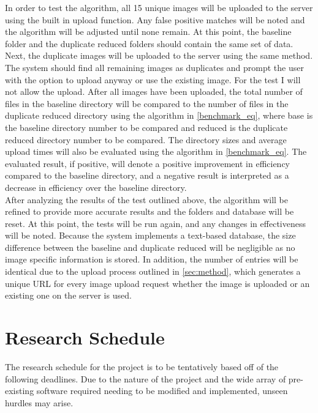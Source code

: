 \documentclass[11pt]{article}
\begin{document}
In order to test the algorithm, all 15 unique images will be uploaded to the server using the built in upload function. Any false positive matches will be noted and the algorithm will be adjusted until none remain. At this point, the baseline folder and the duplicate reduced folders should contain the same set of data. Next, the duplicate images will be uploaded to the server using the same method. The system should find all remaining images as duplicates and prompt the user with the option to upload anyway or use the existing image. For the test I will not allow the upload. After all images have been uploaded, the total number of files in the baseline directory will be compared to the number of files in the duplicate reduced directory using the algorithm in \ref{benchmark_eq}, where base is the baseline directory number to be compared and reduced is the duplicate reduced directory number to be compared.  The directory sizes and average upload times will also be evaluated using the algorithm in \ref{benchmark_eq}. The evaluated result, if positive, will denote a positive improvement in efficiency compared to the baseline directory, and a negative result is interpreted as a decrease in efficiency over the baseline directory.\\

After analyzing the results of the test outlined above, the algorithm will be refined to provide more accurate results and the folders and database will be reset. At this point, the tests will be run again, and any changes in effectiveness will be noted. Because the system implements a text-based database, the size difference between the baseline and duplicate reduced will be negligible as no image specific information is stored. In addition, the number of entries will be identical due to the upload process outlined in \ref{sec:method}, which generates a unique URL for every image upload request whether the image is uploaded or an existing one on the server is used.

\vspace*{-.1in}
\section{Research Schedule}
\label{sec:schedule}
\vspace*{-.1in}

The research schedule for the project is to be tentatively based off of the following deadlines.
Due to the nature of the project and the wide array of pre-existing software required needing to
be modified and implemented, unseen hurdles may arise.\\
\end{document}
